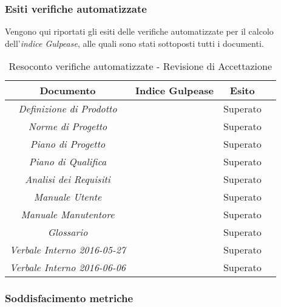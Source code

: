 \subsubsection{Esiti verifiche automatizzate}
Vengono qui riportati gli esiti delle verifiche automatizzate per il calcolo dell'\textit{indice Gulpease}, alle quali sono stati sottoposti tutti i documenti.
\begin{table}[h]
\begin{center}
\begin{tabular}{|c|c|c|c|}
\hline \textbf{Documento} & \textbf{Indice Gulpease} & \textbf{Esito}\\
\hline
\emph{Definizione di Prodotto} &  & Superato \\
\emph{Norme di Progetto} &  & Superato \\
\emph{Piano di Progetto} &  & Superato \\
\emph{Piano di Qualifica} &  & Superato \\
\emph{Analisi dei Requisiti} &  & Superato \\
\emph{Manuale Utente} &  & Superato \\
\emph{Manuale Manutentore} &  & Superato \\
\emph{Glossario} &  & Superato \\
\emph{Verbale Interno 2016-05-27} &  & Superato \\
\emph{Verbale Interno 2016-06-06} &  & Superato \\
\hline
\end{tabular}
\caption{Resoconto verifiche automatizzate - Revisione di Accettazione}
\end{center}
\end{table}

\newpage
\subsubsection{Soddisfacimento metriche}

